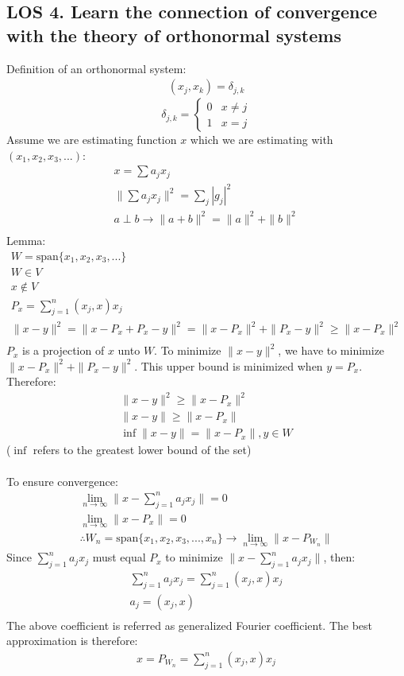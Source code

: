 \documentclass[12pt, a4paper]{article}
\begin{document}
\subsection*{LOS 4. Learn the connection of convergence with the theory of orthonormal systems}
Definition of an orthonormal system:
\begin{gather*}
    (x_j, x_k)= \delta_{j,k}
\end{gather*}
\[ \delta_{j,k} = \begin{cases} 
    0 & x \ne j \\
    1 & x = j
 \end{cases}
\]
Assume we are estimating function $x$ which we are estimating with $(x_1, x_2, x_3, ...)$:
\begin{gather*}
    x = \sum a_jx_j\\
    \|\sum a_jx_j\|^2 = \sum_j|g_j|^2\\
    a \perp b \rightarrow \|a+b\|^2=\|a\|^2+\|b\|^2\\
\end{gather*}
Lemma:
\begin{gather*}
    W = \text{span}\{x_1, x_2, x_3, ...\}\\
    W \in V\\
    x \notin V\\
    P_x = \sum_{j=1}^n(x_j, x)x_j\\
    \|x-y\|^2 = \|x-P_x+P_x-y\|^2 = \|x-P_x\|^2+\|P_x-y\|^2 \geq \|x-P_x\|^2\\
\end{gather*}
$P_x$ is a projection of $x$ unto $W$. To minimize $\|x-y\|^2$, we have to minimize $\|x-P_x\|^2+\|P_x-y\|^2$. This upper bound is minimized when $y = P_x$. Therefore:
\begin{gather*}
    \|x-y\|^2 \geq \|x-P_x\|^2\\
    \|x-y\| \geq \|x-P_x\|\\
    \inf \|x-y\| = \|x-P_x\|, y \in W
\end{gather*}
{\tiny*($\inf$ refers to the greatest lower bound of the set)}\\\\
To ensure convergence:
\begin{gather*}
    \lim_{n \rightarrow \infty} \|x - \sum_{j=1}^n a_jx_j\| = 0\\
    \lim_{n \rightarrow \infty} \|x - P_x\| = 0\\
    \therefore W_n = \text{span}\{x_1, x_2, x_3, ..., x_n\} \rightarrow \lim_{n \rightarrow \infty} \|x - P_{W_n}\| 
\end{gather*}
Since $\sum_{j=1}^n a_jx_j$ must equal $P_x$ to minimize $\|x - \sum_{j=1}^n a_jx_j\|$, then:
\begin{gather*}
    \sum_{j=1}^n a_jx_j = \sum_{j=1}^n(x_j, x)x_j\\
    a_j = (x_j, x)\\
\end{gather*}
The above coefficient is referred as generalized Fourier coefficient. The best approximation is therefore:
\begin{gather*}
    x = P_{W_n} = \sum_{j=1}^n(x_j, x)x_j
\end{gather*}
\vspace{0.3em}
\end{document}
